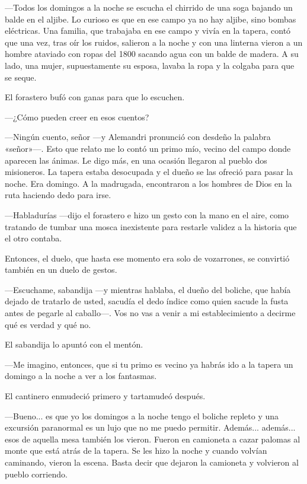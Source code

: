 \documentclass[11pt,twoside,openright]{book}
\begin{document}
 ---Todos los domingos a la noche
 se escucha el chirrido de una soga bajando un balde en el aljibe. Lo curioso
 es que en ese campo ya no hay aljibe, sino bombas eléctricas. Una familia,
 que trabajaba en ese campo y vivía en la tapera, contó que una vez, tras oír los
 ruidos, salieron a la noche y con una linterna vieron a un hombre ataviado
 con ropas del 1800 sacando agua con un balde de madera. A su lado, una mujer,
 supuestamente su esposa, lavaba la ropa y la colgaba para que se seque.
 
 El forastero bufó con ganas para que lo escuchen. 
 
 ---¿Cómo pueden creer en esos cuentos?
 
 ---Ningún cuento, señor ---y Alemandri pronunció con desdeño la palabra
 «señor»---. Esto que relato me lo contó un primo mío, vecino del campo donde
 aparecen las ánimas. Le digo más, en una ocasión llegaron al pueblo dos
 misioneros. La tapera estaba desocupada y el dueño se las ofreció para
 pasar la noche. Era domingo. A la madrugada, encontraron a los hombres de
 Dios en la ruta haciendo dedo para irse.
 
 ---Habladurías ---dijo el forastero e hizo un gesto con la mano en el aire,
 como tratando de tumbar una mosca inexistente para restarle validez a la historia que el otro contaba.
 
 Entonces, el duelo, que hasta ese momento era solo de vozarrones, se convirtió
 también en un duelo de gestos.
 
 ---Escuchame, sabandija ---y mientras hablaba, el dueño del boliche, que había
 dejado de tratarlo de usted, sacudía el dedo índice como quien sacude la
 fusta antes de pegarle al caballo---. Vos no vas a venir a mi establecimiento
 a decirme qué es verdad y qué no.
 
 El sabandija lo apuntó con el mentón. 
 
 ---Me imagino, entonces, que si tu
 primo es vecino ya habrás ido a la tapera un domingo a la noche a ver a
 los fantasmas.
 
 El cantinero enmudeció primero y tartamudeó después. 
 
 ---Bueno... es que yo
 los domingos a la noche tengo el boliche repleto y una excursión paranormal
 es un lujo que no me puedo permitir. Además... además... esos de aquella
 mesa también los vieron. Fueron en camioneta a cazar palomas al monte que
 está atrás de la tapera. Se les hizo la noche y cuando volvían caminando,
 vieron la escena. Basta decir que dejaron la camioneta y volvieron al
 pueblo corriendo.
 
\end{document}
